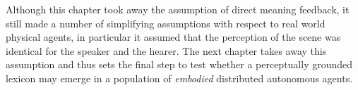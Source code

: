 Although this chapter took away the assumption of 
direct meaning feedback, it still made a number of 
simplifying assumptions with respect to real world
physical agents, in particular it assumed that 
the perception of the scene was identical for
the speaker and the hearer. The next chapter takes away 
this assumption and thus sets the final step to test 
whether a perceptually grounded lexicon may 
emerge in a population of {\it embodied} distributed 
autonomous agents. 

